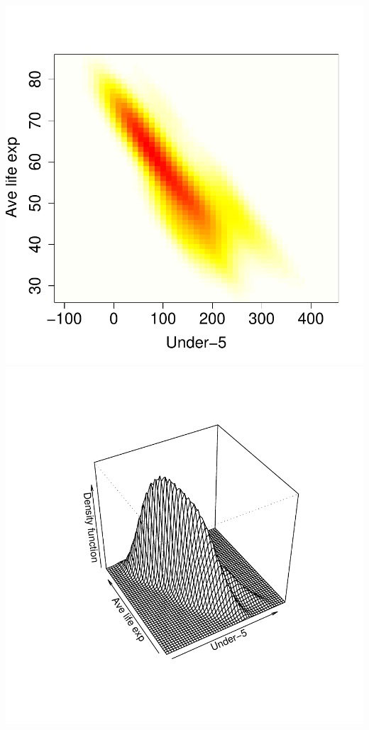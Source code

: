 \documentclass[a4paper,11pt]{article}
\begin{document}
\begin{center}
\includegraphics{kde-021}
\includegraphics{kde-022}
\end{center}
\end{document}
